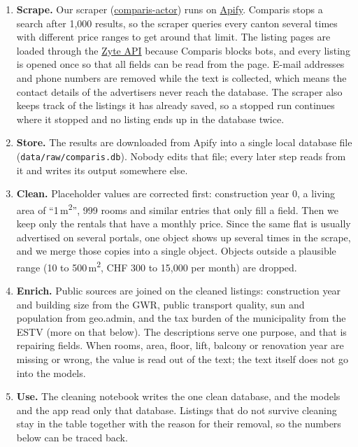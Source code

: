 \documentclass[11pt, a4paper]{article}
\begin{document}
\begin{enumerate}
    \item \textbf{Scrape.} Our scraper (\href{https://github.com/Elias-Martinelli/comparis-actor}{comparis-actor}) runs on \href{https://console.apify.com/actors/E4hkR2fhfBFkfFwiZ/info/readme?build=latest}{Apify}. Comparis stops a search after 1{,}000 results, so the scraper queries every canton several times with different price ranges to get around that limit. The listing pages are loaded through the \href{https://www.zyte.com/zyte-api/}{Zyte API} because Comparis blocks bots, and every listing is opened once so that all fields can be read from the page. E-mail addresses and phone numbers are removed while the text is collected, which means the contact details of the advertisers never reach the database. The scraper also keeps track of the listings it has already saved, so a stopped run continues where it stopped and no listing ends up in the database twice.
    \item \textbf{Store.} The results are downloaded from Apify into a single local database file (\texttt{data/raw/}\allowbreak\texttt{comparis.db}). Nobody edits that file; every later step reads from it and writes its output somewhere else.
    \item \textbf{Clean.} Placeholder values are corrected first: construction year 0, a living area of ``1\,m\textsuperscript{2}'', 999 rooms and similar entries that only fill a field. Then we keep only the rentals that have a monthly price. Since the same flat is usually advertised on several portals, one object shows up several times in the scrape, and we merge those copies into a single object. Objects outside a plausible range (10 to 500\,m\textsuperscript{2}, CHF 300 to 15{,}000 per month) are dropped.
    \item \textbf{Enrich.} Public sources are joined on the cleaned listings: construction year and building size from the GWR, public transport quality, sun and population from geo.admin, and the tax burden of the municipality from the ESTV (more on that below). The descriptions serve one purpose, and that is repairing fields. When rooms, area, floor, lift, balcony or renovation year are missing or wrong, the value is read out of the text; the text itself does not go into the models.
    \item \textbf{Use.} The cleaning notebook writes the one clean database, and the models and the app read only that database. Listings that do not survive cleaning stay in the table together with the reason for their removal, so the numbers below can be traced back.
\end{enumerate}
\end{document}
